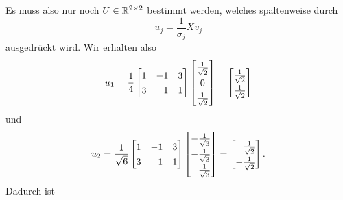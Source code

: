\begin{example}
    Es muss also nur noch \(U \in \mathbb{R}^{2 \times 2}\) bestimmt werden, welches spaltenweise durch
    \begin{equation*}
        u_j = \frac{1}{\sigma_j}Xv_j 
    \end{equation*}
    ausgedrückt wird.
    Wir erhalten also
    \begin{equation*}
        u_1 = \frac{1}{4}
        \begin{bmatrix}
            1 & -1 & 3 \\
            3 & \phantom{-}1 & 1
        \end{bmatrix}
        \begingroup
        \renewcommand{\arraystretch}{1.3}
        \begin{bmatrix}
            \frac{1}{\sqrt{2}} \\
            0 \\
            \frac{1}{\sqrt{2}} \\
        \end{bmatrix}
        =
        \begin{bmatrix}
            \frac{1}{\sqrt{2}} \\
            \frac{1}{\sqrt{2}} \\
        \end{bmatrix}
        \endgroup
    \end{equation*}
    und
    \begin{equation*}
        u_2 = \frac{1}{\sqrt{6}}
        \begin{bmatrix}
            1 & -1 & 3 \\
            3 & \phantom{-}1 & 1
        \end{bmatrix}
        \begingroup
        \renewcommand{\arraystretch}{1.3}
        \begin{bmatrix}
            -\frac{1}{\sqrt{3}} \\
            -\frac{1}{\sqrt{3}} \\
            \phantom{-}\frac{1}{\sqrt{3}} \\
        \end{bmatrix}
        =
        \begin{bmatrix}
            \phantom{-}\frac{1}{\sqrt{2}} \\
            -\frac{1}{\sqrt{2}} \\
        \end{bmatrix}
        \endgroup
        .
    \end{equation*}
    Dadurch ist 
    \begin{equation*}
        \renewcommand{\arraystretch}{1.3}

\end{equation*}
\end{example}
